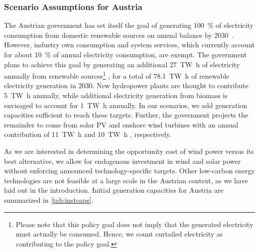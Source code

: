 \documentclass[review, 3p, times, 12pt, authoryear]{elsarticle}
\begin{document}
    \subsubsection{Scenario Assumptions for Austria} \label{subsubsec:assumptions-austria}
    The Austrian government has set itself the goal of generating \SI{100}{\percent} of electricity consumption from domestic renewable sources on annual balance by 2030~.
    However, industry own consumption and system services, which currently account for about \SI{10}{\percent} of annual electricity consumption, are exempt.
    The government plans to achieve this goal by generating an additional \SI{27}{\tera\watt\hour} of electricity annually from renewable sources\footnote{Please note that this policy goal does not imply that the generated electricity must actually be consumed. Hence, we count curtailed electricity as contributing to the policy goal.}
    , for a total of \SI{78.1}{\tera\watt\hour} of renewable electricity generation in 2030.
    New hydropower plants are thought to contribute \SI{5}{\tera\watt\hour} annually, while additional electricity generation from biomass is envisaged to account for \SI{1}{\tera\watt\hour} annually.
    In our scenarios, we add generation capacities sufficient to reach these targets.
    Further, the government projects the remainder to come from solar PV and onshore wind turbines with an annual contribution of \SI{11}{\tera\watt\hour} and \SI{10}{\tera\watt\hour} , respectively.

    As we are interested in determining the opportunity cost of wind power versus its best alternative, we allow for endogenous investment in wind and solar power without enforcing announced technology-specific targets.
    Other low-carbon energy technologies are not feasible at a large scale in the Austrian context, as we have laid out in the introduction.
    Initial generation capacities for Austria are summarized in \autoref{tab:instcaps}.
\end{document}
